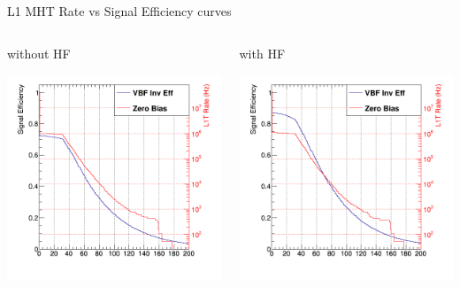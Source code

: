 \documentclass[8pt]{beamer}
\begin{document}
\begin{frame}{L1 MHT Rate vs Signal Efficiency curves}

\begin{columns}

\begin{block}{without HF}
 
\centering
\includegraphics[width=\linewidth]{img/METRange3p0/L1TMHT_Et.png}
 
\end{block}

\begin{block}{with HF}
 
\centering
\includegraphics[width=\linewidth]{img/METRange5p0/L1TMHT_Et.png}
 

\end{block}
\end{columns}
\end{frame}
\end{document}
